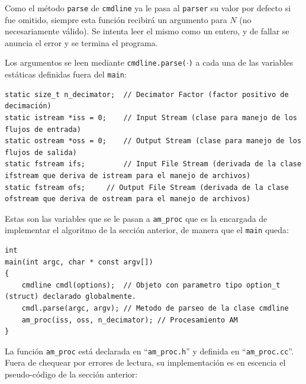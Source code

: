 \documentclass[11pt, spanish]{report}
\begin{document}
Como el método \texttt{parse} de \texttt{cmdline} ya le pasa al \texttt{parser} su valor por defecto si fue omitido, siempre esta función recibirá un argumento para $N$ (no necesariamente válido). Se intenta leer el mismo como un entero, y de fallar se anuncia el error y se termina el programa. 

Los argumentos se leen mediante \texttt{cmdline.parse($\cdot$)} a cada una de las variables estáticas definidas fuera del \texttt{main}:

 
\lstset{language=C++}
\begin{lstlisting}[frame=single]
static size_t n_decimator;	// Decimator Factor (factor positivo de decimación)
static istream *iss = 0;	// Input Stream (clase para manejo de los flujos de entrada)
static ostream *oss = 0;	// Output Stream (clase para manejo de los flujos de salida)
static fstream ifs; 		// Input File Stream (derivada de la clase ifstream que deriva de istream para el manejo de archivos)
static fstream ofs;		// Output File Stream (derivada de la clase ofstream que deriva de ostream para el manejo de archivos)
\end{lstlisting}

Estas son las variables que se le pasan a \texttt{am\_proc} que es la encargada de implementar el algoritmo de la sección anterior, de manera que el \texttt{main} queda:


\lstset{language=C++}
\begin{lstlisting}[frame=single]
int
main(int argc, char * const argv[])
{
	cmdline cmdl(options);	// Objeto con parametro tipo option_t (struct) declarado globalmente.
	cmdl.parse(argc, argv);	// Metodo de parseo de la clase cmdline
	am_proc(iss, oss, n_decimator);	// Procesamiento AM
}
\end{lstlisting}

La función \texttt{am\_proc} está declarada en ``\texttt{am\_proc.h}'' y definida en ``\texttt{am\_proc.cc}''. Fuera de chequear por errores de lectura, su implementación es en escencia el pseudo-código de la sección anterior:
\end{document}
